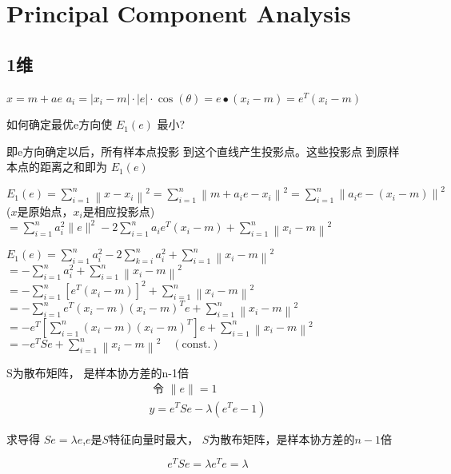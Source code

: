 \chapter{Principal Component Analysis}

\section{1维}

$ x=m+a e $
$ a_{i}=\left|x_{i}-m\right| \cdot|e| \cdot \cos (\theta)=e \bullet\left(x_{i}-m\right)=e^{T}\left(x_{i}-m\right) $

\begin{problem}
    如何确定最优e方向使 $ E_{1}(e) $ 最小?

    即e方向确定以后，所有样本点投影 到这个直线产生投影点。这些投影点 到原样本点的距离之和即为 $ E_{1}({e}) $
\end{problem}


$ E_{1}(e)=\sum_{i=1}^{n}\left\|x-x_{i}\right\|^{2}=\sum_{i=1}^{n}\left\|m+a_{i} e-x_{i}\right\|^{2}=\sum_{i=1}^{n}\left\|a_{i} e-\left(x_{i}-m\right)\right\|^{2} $ ($x$是原始点，$x_i$是相应投影点)
$ =\sum_{i=1}^{n} a_{i}^{2}\|e\|^{2}-2 \sum_{i=1}^{n} a_{i} e^{T}\left(x_{i}-m\right)+\sum_{i=1}^{n}\left\|x_{i}-m\right\|^{2} $

$ E_{1}(e)=\sum_{i=1}^{n} a_{i}^{2}-2 \sum_{k=i}^{n} a_{i}^{2}+\sum_{i=1}^{n}\left\|x_{i}-m\right\|^{2} $
$ =-\sum_{i=1}^{n} a_{i}^{2}+\sum_{i=1}^{n}\left\|x_{i}-m\right\|^{2} $
$ =-\sum_{i=1}^{n}\left[e^{T}\left(x_{i}-m\right)\right]^{2}+\sum_{i=1}^{n}\left\|x_{i}-m\right\|^{2} $
$ =-\sum_{i=1}^{n} e^{T}\left(x_{i}-m\right)\left(x_{i}-m\right)^{T} e+\sum_{i=1}^{n}\left\|x_{i}-m\right\|^{2} $
$ =-e^{T}\left[\sum_{i=1}^{n}\left(x_{i}-m\right)\left(x_{i}-m\right)^{T}\right] e+\sum_{i=1}^{n}\left\|x_{i}-m\right\|^{2} $
$ =-e^{T} S e+\sum_{i=1}^{n}\left\|x_{i}-m\right\|^{2} \quad (\text{const.}) $

S为散布矩阵， 是样本协方差的n-1倍
\begin{equation}
\begin{array}{l}
\text { 令 }\|e\|=1 \\
y=e^{T} S e-\lambda\left(e^{T} e-1\right)
\end{array}
\end{equation}

求导得 $ S e=\lambda e $,$e$是$S$特征向量时最大， $S$为散布矩阵，是样本协方差的$n-1$倍

\begin{equation} e^{T} S e=\lambda e^{T} e=\lambda \end{equation}


